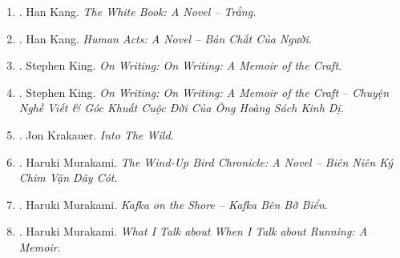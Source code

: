 \documentclass{article}
\begin{document}
\begin{enumerate}
	\item \cite{Kang_white_VN}. {\sc Han Kang}. {\it The White Book: A Novel -- Trắng}.\hfill{\sf[done]}

	\item \cite{Kang_human_nature_VN}. {\sc Han Kang}. {\it Human Acts: A Novel -- Bản Chất Của Người}.\hfill{\sf[done]}

	\item \cite{King2000,King_on_writing}. {\sc Stephen King}. {\it On Writing: On Writing: A Memoir of the Craft}.\hfill{\sf[done]}

	\item \cite{King_on_writing_VN}. {\sc Stephen King}. {\it On Writing: On Writing: A Memoir of the Craft -- Chuyện Nghề Viết \& Góc Khuất Cuộc Đời Của Ông Hoàng Sách Kinh Dị}.\hfill{\sf[done]}

	\item \cite{Krakauer_wild}. {\sc Jon Krakauer}. {\it Into The Wild}.

	\item \cite{Murakami_bird_VN}. {\sc Haruki Murakami}. {\it The Wind-Up Bird Chronicle: A Novel -- Biên Niên Ký Chim Vặn Dây Cót}.\hfill{\sf[done]}

	\item \cite{Murakami_Kafka_VN}. {\sc Haruki Murakami}. {\it Kafka on the Shore -- Kafka Bên Bờ Biển}.\hfill{\sf[done]}

	\item \cite{Murakami_run}. {\sc Haruki Murakami}. {\it What I Talk about When I Talk about Running: A Memoir}. {}


\end{enumerate}
\end{document}

